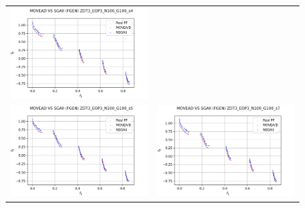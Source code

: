 \begin{figure}[H]
\begin{tabular}{c c}
    \includegraphics[scale=0.5]{figures/ZDT3_EOP3_N100_G100_T15/s4_comp.png}\\
    \includegraphics[scale=0.5]{figures/ZDT3_EOP3_N100_G100_T15/s5_comp.png} &
    \includegraphics[scale=0.5]{figures/ZDT3_EOP3_N100_G100_T15/s7_comp.png}\\

\end{tabular}
\end{figure}
